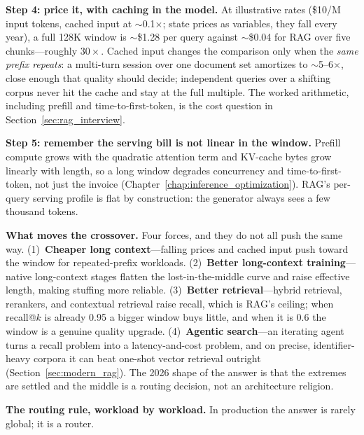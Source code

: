 \textbf{Step 4: price it, with caching in the model.} At illustrative rates (\$10/M input tokens, cached input at $\sim$0.1$\times$; state prices as variables, they fall every year), a full 128K window is $\sim$\$1.28 per query against $\sim$\$0.04 for RAG over five chunks---roughly $30\times$. Cached input changes the comparison only when the \emph{same prefix repeats}: a multi-turn session over one document set amortizes to $\sim$5--6$\times$, close enough that quality should decide; independent queries over a shifting corpus never hit the cache and stay at the full multiple. The worked arithmetic, including prefill and time-to-first-token, is the cost question in Section~\ref{sec:rag_interview}.

\textbf{Step 5: remember the serving bill is not linear in the window.} Prefill compute grows with the quadratic attention term and KV-cache bytes grow linearly with length, so a long window degrades concurrency and time-to-first-token, not just the invoice (Chapter~\ref{chap:inference_optimization}). RAG's per-query serving profile is flat by construction: the generator always sees a few thousand tokens.

\textbf{What moves the crossover.} Four forces, and they do not all push the same way. (1)~\textbf{Cheaper long context}---falling prices and cached input push toward the window for repeated-prefix workloads. (2)~\textbf{Better long-context training}---native long-context stages flatten the lost-in-the-middle curve and raise effective length, making stuffing more reliable. (3)~\textbf{Better retrieval}---hybrid retrieval, rerankers, and contextual retrieval raise recall, which is RAG's ceiling; when recall@$k$ is already 0.95 a bigger window buys little, and when it is 0.6 the window is a genuine quality upgrade. (4)~\textbf{Agentic search}---an iterating agent turns a recall problem into a latency-and-cost problem, and on precise, identifier-heavy corpora it can beat one-shot vector retrieval outright (Section~\ref{sec:modern_rag}). The 2026 shape of the answer is that the extremes are settled and the middle is a routing decision, not an architecture religion.

\textbf{The routing rule, workload by workload.} In production the answer is rarely global; it is a router.


